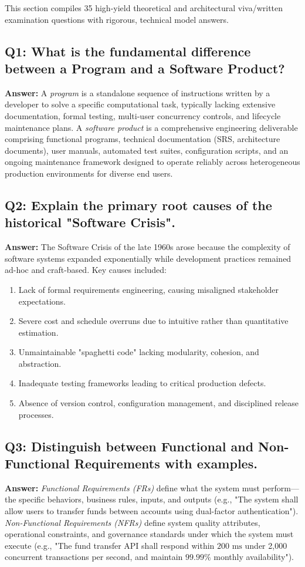 This section compiles 35 high-yield theoretical and architectural viva/written examination questions with rigorous, technical model answers.

\subsection*{Q1: What is the fundamental difference between a Program and a Software Product?}
\textbf{Answer:} A \textit{program} is a standalone sequence of instructions written by a developer to solve a specific computational task, typically lacking extensive documentation, formal testing, multi-user concurrency controls, and lifecycle maintenance plans. A \textit{software product} is a comprehensive engineering deliverable comprising functional programs, technical documentation (SRS, architecture documents), user manuals, automated test suites, configuration scripts, and an ongoing maintenance framework designed to operate reliably across heterogeneous production environments for diverse end users.

\subsection*{Q2: Explain the primary root causes of the historical "Software Crisis".}
\textbf{Answer:} The Software Crisis of the late 1960s arose because the complexity of software systems expanded exponentially while development practices remained ad-hoc and craft-based. Key causes included:
\begin{enumerate}[label=\arabic*.]
    \item Lack of formal requirements engineering, causing misaligned stakeholder expectations.
    \item Severe cost and schedule overruns due to intuitive rather than quantitative estimation.
    \item Unmaintainable "spaghetti code" lacking modularity, cohesion, and abstraction.
    \item Inadequate testing frameworks leading to critical production defects.
    \item Absence of version control, configuration management, and disciplined release processes.
\end{enumerate}

\subsection*{Q3: Distinguish between Functional and Non-Functional Requirements with examples.}
\textbf{Answer:} \textit{Functional Requirements (FRs)} define what the system must perform---the specific behaviors, business rules, inputs, and outputs (e.g., "The system shall allow users to transfer funds between accounts using dual-factor authentication"). \textit{Non-Functional Requirements (NFRs)} define system quality attributes, operational constraints, and governance standards under which the system must execute (e.g., "The fund transfer API shall respond within $200\text{ ms}$ under 2,000 concurrent transactions per second, and maintain $99.99\%$ monthly availability").

